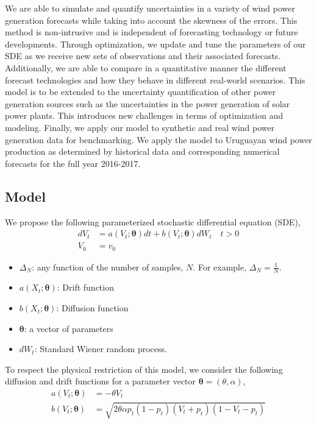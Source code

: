 \documentclass[10pt,twocolumn,letterpaper]{article}
\begin{document}
    We are able to simulate and quantify uncertainties in a variety of wind power generation forecasts while taking into account the skewness of the errors. This method is non-intrusive and is independent of forecasting technology or future developments. Through optimization, we update and tune the parameters of our SDE as we receive new sets of observations and their associated forecasts. Additionally, we are able to compare in a quantitative manner the different forecast technologies and how they behave in different real-world scenarios. This model is to be extended to the uncertainty quantification of other power generation sources such as the uncertainties in the power generation of solar power plants. This introduces new challenges in terms of optimization and modeling. Finally, we apply our model to synthetic and real wind power generation data for benchmarking. We apply the model to Uruguayan wind power production as determined by historical data and corresponding numerical forecasts for the full year 2016-2017.

\subsection{Model}

We propose the following parameterized stochastic differential equation (SDE), 
\begin{equation}
\begin{split}
dV_t &= a(V_t; \bm{\theta}) dt + b (V_t; \bm{\theta} ) dW_t \quad t > 0 \\
V_0 & = v_0
\end{split}\label{main}
\end{equation}


\begin{itemize}
\item $\Delta_N$: any function of the number of samples, $N$. For example, $\Delta_N = \frac{1}{N}$.
\item $a(X_t; \bm{\theta})$: Drift function 
\item $b (X_t; \bm{\theta} )$: Diffusion function 
\item $\bm{\theta}$: a vector of parameters
\item $dW_t$: Standard Wiener random process.
\end{itemize}


To respect the physical restriction of this model, we consider the following diffusion and drift functions for a parameter vector $\bm{\theta} = (\theta, \alpha)$,  
\begin{equation}
\begin{split}
a(V_t; \bm{\theta}) &= - \theta V_t \\
b(V_t; \bm{\theta}) &=\sqrt{2 \theta \alpha p_t(1-p_t) (V_t +p_t ) (1-V_t-p_t)}  \\
\end{split}
\end{equation}
\end{document}

